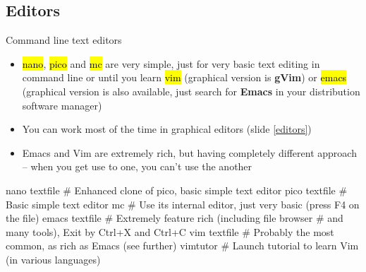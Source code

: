 \documentclass[compress, ucs, xelatex, 11pt, xcolor=svgnames,
  hyperref={
    bookmarks=true,
    unicode=true,
    colorlinks=true,
    pdftitle={Linux, command line and MetaCentrum},
    plainpages=false,
    pdfauthor={Vojtech Zeisek},
    pdfsubject={Course about use of Linux command line, writing shell scripts and using MetaCentrum of CESNET},
    pdfcreator={XeLaTeX},
    pdfkeywords={Linux, GNU, BASH, shell, command line, MetaCentrum},
    linkcolor=DarkRed,
    anchorcolor=DarkBlue,
    citecolor=Indigo,
    filecolor=NavyBlue,
    menucolor=DarkMagenta,
    urlcolor=DarkBlue,
    pdftex},
  url={hyphens, lowtilde} %
  ]{beamer}
\renewcommand{\texttt}[1]{\hl{\ttfamily #1}}
\begin{document}
\subsection{Editors} 

\begin{frame}[fragile]{Command line text editors}
  \begin{itemize}
    \item \texttt{nano}, \texttt{pico} and \texttt{mc} are very simple, just for very basic text editing in command line or until you learn \texttt{vim} (graphical version is \textbf{gVim}) or \texttt{emacs} (graphical version is also available, just search for \textbf{Emacs} in your distribution software manager)
    \item You can work most of the time in graphical editors (slide \ref{editors})
    \item Emacs and Vim are extremely rich, but having completely different approach -- when you get use to one, you can't use the another
  \end{itemize}
  \begin{bashcode}
    nano textfile # Enhanced clone of pico, basic simple text editor
    pico textfile # Basic simple text editor
    mc # Use its internal editor, just very basic (press F4 on the file)
    emacs textfile # Extremely feature rich (including file browser
                   # and many tools), Exit by Ctrl+X and Ctrl+C
    vim textfile # Probably the most common, as rich as Emacs (see further)
    vimtutor # Launch tutorial to learn Vim (in various languages)
   \end{bashcode}
\end{frame}
\end{document}
